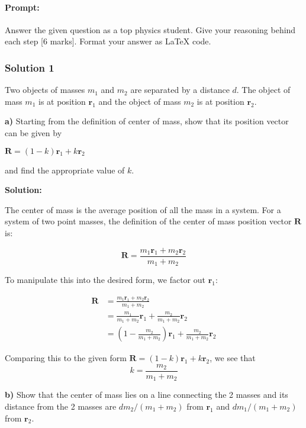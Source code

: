\documentclass{article}
\begin{document}
\paragraph{Prompt: \\} 
Answer the given question as a top physics student. Give your reasoning behind each step [6 marks].
Format your answer as LaTeX code.

\subsubsection{Solution 1}
Two objects of masses $m_1$ and $m_2$ are separated by a distance $d$. The object of mass $m_1$ is at position $\mathbf{r}_1$ and the object of mass $m_2$ is at position $\mathbf{r}_2$.

\textbf{a)} Starting from the definition of center of mass, show that its position vector can be given by 

  $\mathbf{R} = (1 - k)\mathbf{r}_1 + k\mathbf{r}_2$ 

  and find the appropriate value of $k$.

\textbf{Solution:}

The center of mass is the average position of all the mass in a system.  For a system of two point masses, the definition of the center of mass position vector $\mathbf{R}$ is:

\begin{equation*}
\mathbf{R} = \frac{m_1 \mathbf{r}_1 + m_2 \mathbf{r}_2}{m_1 + m_2}
\end{equation*}

To manipulate this into the desired form, we factor out $\mathbf{r}_1$:

\begin{align*}
\mathbf{R} &= \frac{m_1 \mathbf{r}_1 + m_2 \mathbf{r}_2}{m_1 + m_2} \\
&= \frac{m_1}{m_1 + m_2} \mathbf{r}_1 + \frac{m_2}{m_1 + m_2} \mathbf{r}_2 \\
&= \left( 1 - \frac{m_2}{m_1 + m_2} \right) \mathbf{r}_1 + \frac{m_2}{m_1 + m_2} \mathbf{r}_2
\end{align*}

Comparing this to the given form $\mathbf{R} = (1 - k)\mathbf{r}_1 + k\mathbf{r}_2$, we see that 
\begin{equation*}
k = \frac{m_2}{m_1 + m_2}
\end{equation*}

\textbf{b)} Show that the center of mass lies on a line connecting the 2 masses and its distance from the 2 masses are $dm_2/(m_1 + m_2)$ from $\mathbf{r}_1$ and $dm_1/(m_1 + m_2)$ from $\mathbf{r}_2$.
\end{document}
